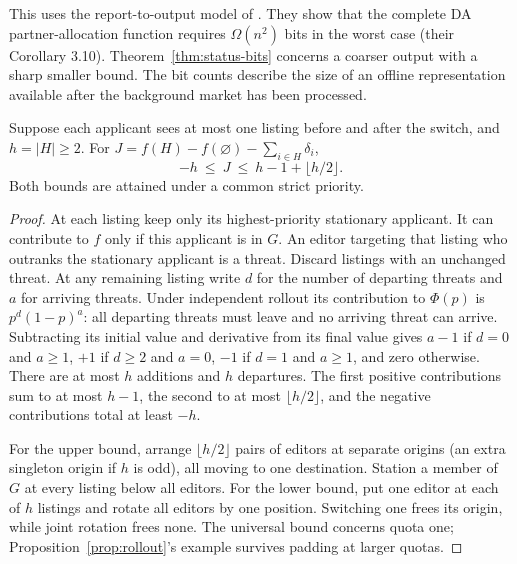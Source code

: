 This uses the report-to-output model of \citet{gtcomplexity}. They show that the complete DA partner-allocation function requires $\Omega(n^2)$ bits in the worst case (their Corollary 3.10). Theorem~\ref{thm:status-bits} concerns a coarser output with a sharp smaller bound. The bit counts describe the size of an offline representation available after the background market has been processed.


\begin{theorem}\label{thm:interaction}
Suppose each applicant sees at most one listing before and after the switch, and $h=|H|\ge2$. For $J=f(H)-f(\varnothing)-\sum_{i\in H}\delta_i$,
\[
                      -h \ \leq\ J\ \leq\ h-1+\lfloor h/2\rfloor .
\]
Both bounds are attained under a common strict priority.
\end{theorem}
\begin{proof}
At each listing keep only its highest-priority stationary applicant. It can contribute to $f$ only if this applicant is in $G$. An editor targeting that listing who outranks the stationary applicant is a threat. Discard listings with an unchanged threat. At any remaining listing write $d$ for the number of departing threats and $a$ for arriving threats. Under independent rollout its contribution to $\Phi(p)$ is $p^d(1-p)^a$: all departing threats must leave and no arriving threat can arrive. Subtracting its initial value and derivative from its final value gives $a-1$ if $d=0$ and $a\ge1$, $+1$ if $d\ge2$ and $a=0$, $-1$ if $d=1$ and $a\ge1$, and zero otherwise. There are at most $h$ additions and $h$ departures. The first positive contributions sum to at most $h-1$, the second to at most $\lfloor h/2\rfloor$, and the negative contributions total at least $-h$.

For the upper bound, arrange $\lfloor h/2\rfloor$ pairs of editors at separate origins (an extra singleton origin if $h$ is odd), all moving to one destination. Station a member of $G$ at every listing below all editors. For the lower bound, put one editor at each of $h$ listings and rotate all editors by one position. Switching one frees its origin, while joint rotation frees none. The universal bound concerns quota one; Proposition~\ref{prop:rollout}'s example survives padding at larger quotas.
\end{proof}
